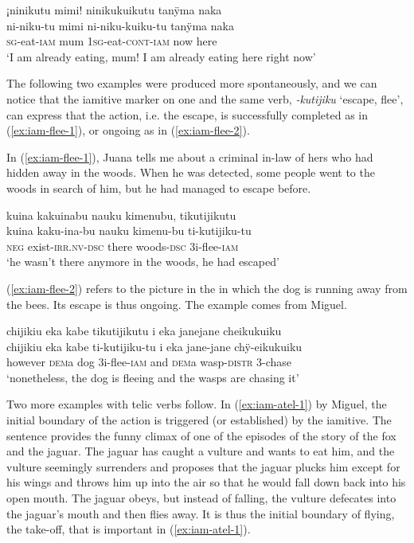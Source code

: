 \ea\label{ex:atelic-cont-iam}
\begingl
\glpreamble ¡ninikutu mimi! ninikukuikutu tanÿma naka\\
\gla ni-niku-tu mimi ni-niku-kuiku-tu tanÿma naka\\
\textsc{sg}-eat-\textsc{iam} mum 1\textsc{sg}-eat-\textsc{cont}-\textsc{iam} now here\\
\glft ‘I am already eating, mum! I am already eating here right now’
\endgl
\trailingcitation{[jxx-e181104l-3]}
\xe
{}

The following two examples were produced more spontaneously, and we can notice that the iamitive marker on one and the same verb, \textit{-kutijiku} ‘escape, flee’, can express that the action, i.e. the escape, is successfully completed as in (\ref{ex:iam-flee-1}), or ongoing as in (\ref{ex:iam-flee-2}).

In (\ref{ex:iam-flee-1}), Juana tells me about a criminal in-law of hers who had hidden away in the woods. When he was detected, some people went to the woods in search of him, but he had managed to escape before.

\ea\label{ex:iam-flee-1}
\begingl
\glpreamble kuina kakuinabu nauku kimenubu, tikutijikutu\\
\gla kuina kaku-ina-bu nauku kimenu-bu ti-kutijiku-tu\\
\glb \textsc{neg} exist-\textsc{irr.nv}-\textsc{dsc} there woods-\textsc{dsc} 3i-flee-\textsc{iam}\\
\glft ‘he wasn’t there anymore in the woods, he had escaped’
\endgl
\trailingcitation{[jxx-p120430l-2.053]}
\xe

(\ref{ex:iam-flee-2}) refers to the picture in the  in which the dog is running away from the bees. Its escape is thus ongoing. The example comes from Miguel.

\ea\label{ex:iam-flee-2}
\begingl
\glpreamble chijikiu eka kabe tikutijikutu i eka janejane cheikukuiku\\
\gla chijikiu eka kabe ti-kutijiku-tu i eka jane-jane chÿ-eikukuiku\\
\glb however \textsc{dem}a dog 3i-flee-\textsc{iam} and \textsc{dem}a wasp-\textsc{distr} 3-chase\\
\glft ‘nonetheless, the dog is fleeing and the wasps are chasing it’
\endgl
\trailingcitation{[mox-a110920l-2.104]}
\xe

Two more examples with telic verbs follow. In (\ref{ex:iam-atel-1}) by Miguel, the initial boundary of the action is triggered (or established) by the iamitive. The sentence provides the funny climax of one of the episodes of the story of the fox and the jaguar. The jaguar has caught a vulture and wants to eat him, and the vulture seemingly surrenders and proposes that the jaguar plucks him except for his wings and throws him up into the air so that he would fall down back into his open mouth. The jaguar obeys, but instead of falling, the vulture defecates into the jaguar’s mouth and then flies away. It is thus the initial boundary of flying, the take-off, that is important in (\ref{ex:iam-atel-1}).

